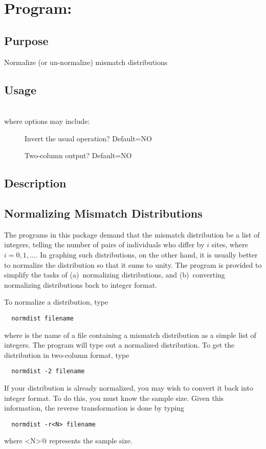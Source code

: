 \chapter{Program: \label{ch.normdist}}

\section{Purpose} Normalize (or un-normalize) mismatch distributions

\section{Usage\label{sec.normdist.usage}} \\
where options may include:
\begin{description}
\item[] Invert the usual operation? Default=NO
\item[]    Two-column output? Default=NO
\end{description}

\section{Description}

\section{Normalizing Mismatch Distributions}

The programs in this package demand that the mismatch distribution be
a list of integers, telling the number of pairs of individuals who
differ by $i$ sites, where $i=0,1,\ldots{}$.  In graphing such
distributions, on the other hand, it is usually better to normalize
the distribution so that it sums to unity.  The  program
is provided to simplify the tasks of (a)~normalizing distributions,
and (b)~converting normalizing distributions back to integer format.

To normalize a distribution, type
\begin{verbatim}
  normdist filename
\end{verbatim}
where  is the name of a file containing a mismatch
distribution as a simple list of integers.  The program will type out
a normalized distribution.  To get the distribution in two-column
format, type
\begin{verbatim}
  normdist -2 filename
\end{verbatim}
If your distribution is already normalized, you may wish to convert it
back into integer format.  To do this, you must know the sample size.
Given this information, the reverse transformation is done by typing
\begin{verbatim}
  normdist -r<N> filename
\end{verbatim}

where \verb@<N>@ represents the sample size.


